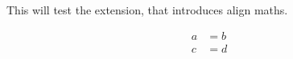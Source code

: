 This will test the extension, that introduces align maths.


\begin{align}
    a &= b \\
    c &= d
\end{align}

